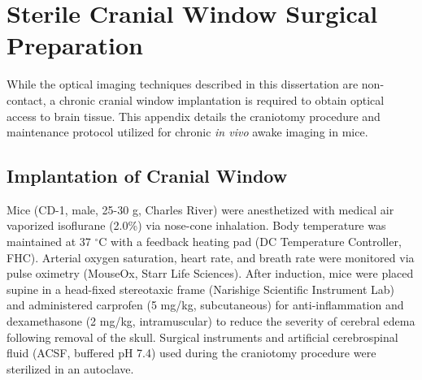 
\chapter{Sterile Cranial Window Surgical Preparation} \label{app:cranial_window}

While the optical imaging techniques described in this dissertation are non-contact, a chronic cranial window implantation is required to obtain optical access to brain tissue. This appendix details the craniotomy procedure and maintenance protocol utilized for chronic \textit{in vivo} awake imaging in mice.


\section{Implantation of Cranial Window}

Mice (CD-1, male, 25-30 g, Charles River) were anesthetized with medical air vaporized isoflurane (2.0\%) via nose-cone inhalation. Body temperature was maintained at 37 $^\circ$C with a feedback heating pad (DC Temperature Controller, FHC). Arterial oxygen saturation, heart rate, and breath rate were monitored via pulse oximetry (MouseOx, Starr Life Sciences). After induction, mice were placed supine in a head-fixed stereotaxic frame (Narishige Scientific Instrument Lab) and administered carprofen (5 mg/kg, subcutaneous) for anti-inflammation and dexamethasone (2 mg/kg, intramuscular) to reduce the severity of cerebral edema following removal of the skull. Surgical instruments and artificial cerebrospinal fluid (ACSF, buffered pH 7.4) used during the craniotomy procedure were sterilized in an autoclave.

